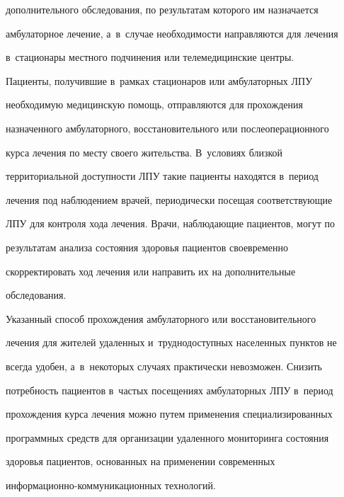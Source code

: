 дополнительного обследования, по результатам которого им назначается 


амбулаторное лечение, а~в~случае необходимости на\-прав\-ля\-ют\-ся для лечения 


в~стационары местного подчинения или телемедицинские центры.


{





}


  


  Пациенты, получившие в~рамках стационаров или амбулаторных ЛПУ 


необходимую медицинскую помощь, отправляются для прохождения 


назначенного амбулаторного, восстановительного или послеоперационного 


курса лечения по месту своего жительства. В~условиях близкой 


территориальной доступности ЛПУ такие пациенты находятся в~период 


лечения под наблюдением врачей, периодически посещая соответствующие 


ЛПУ для контроля хода лечения. Врачи, наблюдающие пациентов, могут по 


результатам анализа состояния здоровья пациентов своевременно 


скорректировать ход лечения или направить их на дополнительные 


обследования.


  


  Указанный способ прохождения амбулаторного или восстановительного 


лечения для жителей удаленных и~труднодоступных населенных пунктов не 


всегда удобен, а~в~некоторых случаях практически невозможен. Снизить 


потребность пациентов в~частых посещениях амбулаторных ЛПУ в~период 


прохождения курса лечения можно путем применения специализированных 


программных средств для организации удаленного мониторинга состояния 


здоровья пациентов, основанных на применении современных  


ин\-фор\-ма\-ци\-он\-но-ком\-му\-ни\-ка\-ци\-он\-ных технологий. 


